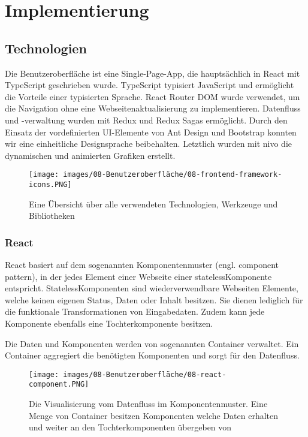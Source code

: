 \section{Implementierung}\label{sec:08_05_implementierung}

\subsection{Technologien}
Die Benutzeroberfläche ist eine Single-Page-App, die hauptsächlich in React mit TypeScript geschrieben wurde. TypeScript typisiert JavaScript und ermöglicht die Vorteile einer typisierten Sprache. React Router DOM wurde verwendet, um die Navigation ohne eine Webseitenaktualisierung zu implementieren. Datenfluss und -verwaltung wurden mit Redux und Redux Sagas ermöglicht.  Durch den Einsatz der vordefinierten UI-Elemente von Ant Design und Bootstrap konnten wir eine einheitliche Designsprache beibehalten. Letztlich wurden mit nivo die dynamischen und animierten Grafiken erstellt.


\begin{figure}[hbt!]%
  \centering
  \texttt{[image: images/08-Benutzeroberfläche/08-frontend-framework-icons.PNG]}
  \caption{Eine Übersicht über alle verwendeten Technologien, Werkzeuge und Bibliotheken}%
\end{figure}



\subsubsection{React}
React basiert auf dem sogenannten Komponentenmuster (engl. \dq component pattern\dq), in der jedes Element einer Webseite einer \dq stateless\dq Komponente entspricht. \dq Stateless\dq Komponenten sind wiederverwendbare Webseiten Elemente, welche keinen eigenen Status, Daten oder Inhalt besitzen. Sie dienen lediglich für die funktionale Transformationen von Eingabedaten.\cite{ReactDoc} Zudem kann jede Komponente ebenfalls eine Tochterkomponente besitzen.

Die Daten und Komponenten werden von sogenannten Container verwaltet. Ein Container aggregiert die benötigten Komponenten und sorgt für den Datenfluss.

\begin{figure}[hbt!]%
  \centering
  \texttt{[image: images/08-Benutzeroberfläche/08-react-component.PNG]}
  \caption{Die Visualisierung vom Datenfluss im Komponentenmuster. Eine Menge von Container besitzen Komponenten welche Daten erhalten und weiter an den Tochterkomponenten übergeben von \cite{itnext18}}%
\end{figure}

